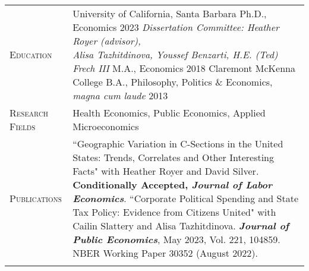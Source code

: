 \documentclass[11pt]{article}
\newcommand{\xspace}{19pt}
\begin{document}
\begin{tabularx}{\textwidth}{@{}Y Z@{}}
	\textsc{Education} &
	University of California, Santa Barbara
	\vspace{3pt} \newline
	\hspace*{20pt} Ph.D., Economics \hfill 2023%
	\vspace{3pt} \newline
	\hspace*{20pt} \textit{Dissertation Committee: Heather Royer (advisor), \newline \hspace*{20pt} Alisa Tazhitdinova, Youssef Benzarti, H.E. (Ted) Frech III} 
	\vspace{3pt} \newline
	\hspace*{20pt} M.A., Economics \hfill 2018%
	\vspace{10pt} \newline
	Claremont McKenna College
	\vspace{3pt} \newline
	\hspace*{20pt} B.A., Philosophy, Politics \& Economics, \textit{magna cum laude} \hfill 2013%
    \\  \addlinespace[\xspace] 

	\textsc{Research Fields} & 
	Health Economics, Public Economics, Applied Microeconomics
	\\ \addlinespace[\xspace] 

	\textsc{Publications} & 
	``Geographic Variation in C-Sections in the United States: Trends, Correlates \newline and Other Interesting Facts" with Heather Royer and David Silver. \newline \textbf{Conditionally Accepted, \textit{Journal of Labor Economics}}.
	\vspace{10pt} \newline
	``Corporate Political Spending and State Tax Policy: Evidence from Citizens United" \newline with Cailin Slattery and Alisa Tazhitdinova. \textbf{\textit{Journal of Public Economics}}, \newline May 2023, Vol. 221, 104859. NBER Working Paper 30352 (August 2022).
	\\ \addlinespace[\xspace] 
	

\end{tabularx}
\end{document}

